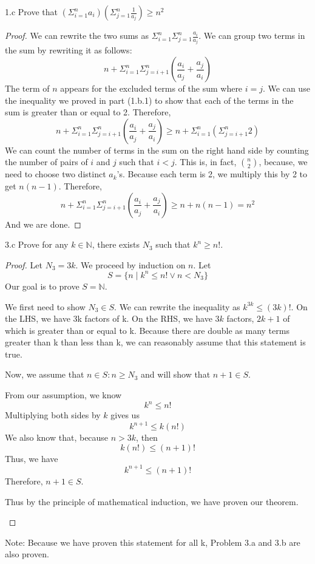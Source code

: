 \documentclass[boxes,sansserif]{rutgers_hw}
\begin{document}

\begin{exern}{1.c} 
    Prove that ${(\Sigma^n_{i=1}{a_i})}{(\Sigma^n_{j=1}{\frac{1}{a_j}})} \ge n^2$
\end{exern}

\begin{proof} 
    We can rewrite the two sums as $\Sigma^n_{i=1}{\Sigma^n_{j=1}{\frac{a_i}{a_j}}}$. 
    We can group two terms in the sum by rewriting it as follows:
    \[ n + \Sigma^n_{i=1}\Sigma^n_{j=i+1}{\left(\frac{a_i}{a_j} + \frac{a_j}{a_i}\right)}\]
    The term of $n$ appears for the excluded terms of the sum where $i = j$.
    We can use the inequality we proved in part (1.b.1) to show that each of the terms in the sum is greater than or equal to 2.
    Therefore,
    \[ n + \Sigma^n_{i=1}\Sigma^n_{j=i+1}{\left(\frac{a_i}{a_j} + \frac{a_j}{a_i}\right)} \ge n + \Sigma^n_{i=1}\left(\Sigma^n_{j=i+1}{2}\right)\]
    We can count the number of terms in the sum on the right hand side by counting the number of pairs of $i$ and $j$ such that $i < j$.
    This is, in fact, $n \choose 2$, because, we need to choose two distinct $a_k$'s. Because each term is 2, we multiply this by 2 to get $n(n-1)$. 
    Therefore,
    \[ n + \Sigma^n_{i=1}\Sigma^n_{j=i+1}{\left(\frac{a_i}{a_j} + \frac{a_j}{a_i}\right)} \ge n + n(n-1) = n^2\]
    And we are done.
\end{proof}


\begin{exern}{3.c}
  Prove for any $k \in \mathbb{N}$, there exists $N_3$ such that $k^n \ge {n!}$.
\end{exern}
\begin{proof} 
  Let $N_3 = 3k$. We proceed by induction on $n$. 
  Let \[S = \{n \mid k^n \le n! \lor n < N_3\}\] 
  Our goal is to prove $S = \mathbb{N}$.
  \begin{induction}
    \begin{basecase}
      We first need to show $N_3 \in S$. We can rewrite the inequality as $k^{3k} \le {(3k)!}$. On the LHS, we have 3k factors of k. On the RHS, we have $3k$ factors, $2k+1$ of which is greater than or equal to k. Because there are double as many terms greater than k than less than k, we can reasonably assume that this statement is true. 
    \end{basecase}
    \begin{indhyp}
      Now, we assume that $n \in S: n \ge N_3$ and will show that $n+1 \in S$.
    \end{indhyp}
    \begin{indstep}
      From our assumption, we know
      \[ k^n \le n! \]
      Multiplying both sides by $k$ gives us
      \[ k^{n+1} \le k(n!) \]
      We also know that, because $n > 3k$, then
      \[ k(n!) \le (n+1)! \]
      Thus, we have
      \[ k^{n+1} \le (n+1)! \]
      Therefore, $n+1 \in S$.
    \end{indstep}
    Thus by the principle of mathematical induction, we have proven our theorem.
  \end{induction}
\end{proof}

\begin{description}
    \item Note: Because we have proven this statement for all k, Problem 3.a and 3.b are also proven.
\end{description}
\end{document}
